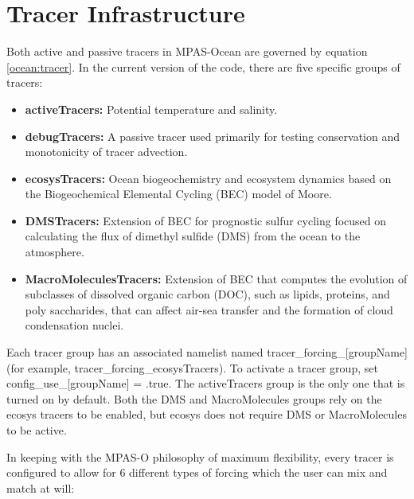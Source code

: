 \chapter{Tracer Infrastructure}
\label{chap:tracers}

Both active and passive tracers in MPAS-Ocean are governed by equation \ref{ocean:tracer}.  In the current version of the code, there are five specific groups of tracers:

\begin{itemize}
\item{{\bf{activeTracers:}} Potential temperature and salinity.} 
\item{{\bf{debugTracers:}} A passive tracer used primarily for testing conservation and monotonicity of tracer advection.}
\item{{\bf{ecosysTracers:}} Ocean biogeochemistry and ecosystem dynamics based on the Biogeochemical Elemental Cycling (BEC) model of Moore.}
\item{{\bf{DMSTracers:}} Extension of BEC for prognostic sulfur cycling focused on calculating the flux of dimethyl sulfide (DMS) from the ocean to the atmosphere.}
\item{{\bf{MacroMoleculesTracers:}} Extension of BEC that computes the evolution of subclasses of dissolved organic carbon (DOC), such as lipids, proteins, and poly saccharides, that can affect air-sea transfer and the formation of cloud condensation nuclei.}
\end{itemize}

Each tracer group has an associated namelist named tracer\_forcing\_[groupName] (for example, tracer\_forcing\_ecosysTracers).  To activate a tracer group, set config\_use\_[groupName] = .true. The activeTracers group is the only one that is turned on by default.  Both the DMS and MacroMolecules groups rely on the ecosys tracers to be enabled, but ecosys does not require DMS or MacroMolecules to be active.

In keeping with the MPAS-O philosophy of maximum flexibility, every tracer is configured to allow for 6 different types of forcing which the user can mix and match at will:

